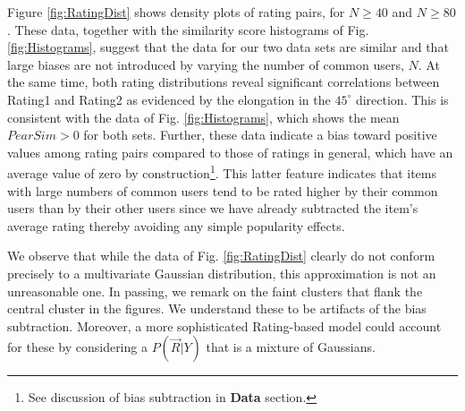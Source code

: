 \documentclass[11pt]{article}
\begin{document}
Figure \ref{fig:RatingDist} shows density plots of rating pairs, for $N \geq 40$
and $N \geq 80$. These data, together with the similarity score histograms of Fig.
\ref{fig:Histograms}, suggest that the data for our two data sets are similar
and that large biases are not introduced by varying the number of common users,
$N$. At the same time, both rating distributions reveal significant correlations
between Rating1 and Rating2 as evidenced by the elongation in the $45^\circ$
direction. This is consistent with the data of Fig. \ref{fig:Histograms}, which
shows the mean $PearSim > 0$ for both sets. Further, these data indicate a
bias toward positive values among rating pairs compared to those of ratings in
general, which have an average value of zero by construction\footnote{See
discussion of bias subtraction in {\bf Data} section.}. This latter feature
indicates that items with large numbers of common users tend to be rated higher
by their common users than by their other users since we have already subtracted
the item's average rating thereby avoiding any simple popularity effects.

We observe that while the data of Fig. \ref{fig:RatingDist} clearly do not
conform precisely to a multivariate Gaussian distribution, this approximation is
not an unreasonable one. In passing, we remark on the faint clusters that flank
the central cluster in the figures. We understand these to be artifacts of the
bias subtraction. Moreover, a more sophisticated Rating-based model could
account for these by considering a $P(\vec{R} | Y)$ that is a mixture of
Gaussians. 
\end{document}
